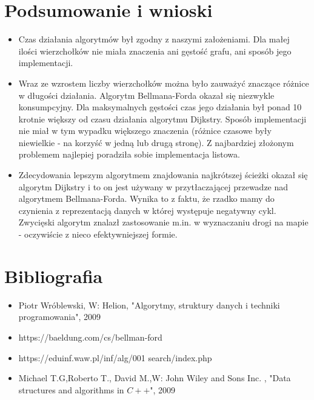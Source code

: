 \documentclass[10pt,a4paper]{article} %
\begin{document}
	\section{Podsumowanie i wnioski}
	\begin{itemize}
		\item Czas działania algorytmów był zgodny z naszymi założeniami. Dla małej ilości wierzchołków nie miała znaczenia ani gęstość grafu, ani sposób jego implementacji. 
		\item Wraz ze wzrostem liczby wierzchołków można było zauważyć znaczące różnice w długości działania. Algorytm Bellmana-Forda okazał się niezwykle konsumpcyjny. Dla maksymalnych gęstości czas jego działania był ponad 10 krotnie większy od czasu działania algorytmu Dijkstry. Sposób implementacji nie miał w tym wypadku większego znaczenia (różnice czasowe były niewielkie - na korzyść w jedną lub drugą stronę). Z najbardziej złożonym problemem najlepiej poradziła sobie implementacja listowa.
		\item Zdecydowania lepszym algorytmem znajdowania najkrótszej ścieżki okazał się algorytm Dijkstry i to on jest używany w przytłaczającej przewadze nad algorytmem Bellmana-Forda. Wynika to z faktu, że rzadko mamy do czynienia z reprezentacją danych w której występuje negatywny cykl. Zwycięski algorytm znalazł zastosowanie m.in. w wyznaczaniu drogi na mapie - oczywiście z nieco efektywniejszej formie. 
	\end{itemize}
	\section{Bibliografia}
	\begin{itemize}
		\item Piotr Wróblewski, W: Helion, "Algorytmy, struktury danych i techniki programowania", 2009
		\item https://baeldung.com/cs/bellman-ford
		\item https://eduinf.waw.pl/inf/alg/001 search/index.php
		\item Michael T.G,Roberto T., David M.,W: John Wiley and Sons Inc. , "Data structures and algorithms in $C++$", 2009 	
\end{itemize}

		
\end{document}
